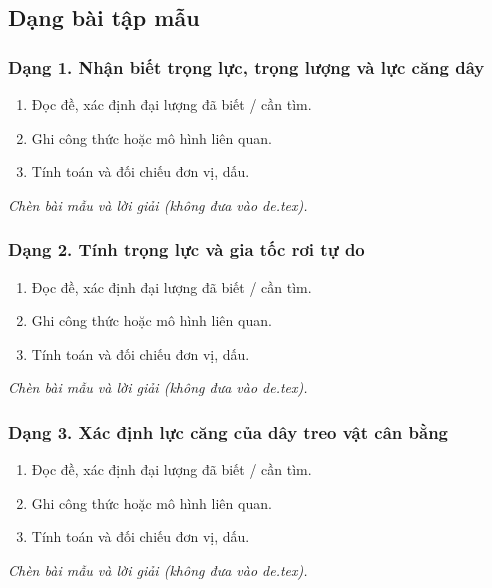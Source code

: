 

\subsection{Dạng bài tập mẫu}
\subsubsection{Dạng 1. Nhận biết trọng lực, trọng lượng và lực căng dây}
\begin{phuongphap}
\begin{enumerate}
\item Đọc đề, xác định đại lượng đã biết / cần tìm.
\item Ghi công thức hoặc mô hình liên quan.
\item Tính toán và đối chiếu đơn vị, dấu.
\end{enumerate}
\end{phuongphap}
\begin{vidumau}
\textit{Chèn bài mẫu và lời giải (không đưa vào de.tex).}
\end{vidumau}

\subsubsection{Dạng 2. Tính trọng lực và gia tốc rơi tự do}
\begin{phuongphap}
\begin{enumerate}
\item Đọc đề, xác định đại lượng đã biết / cần tìm.
\item Ghi công thức hoặc mô hình liên quan.
\item Tính toán và đối chiếu đơn vị, dấu.
\end{enumerate}
\end{phuongphap}
\begin{vidumau}
\textit{Chèn bài mẫu và lời giải (không đưa vào de.tex).}
\end{vidumau}

\subsubsection{Dạng 3. Xác định lực căng của dây treo vật cân bằng}
\begin{phuongphap}
\begin{enumerate}
\item Đọc đề, xác định đại lượng đã biết / cần tìm.
\item Ghi công thức hoặc mô hình liên quan.
\item Tính toán và đối chiếu đơn vị, dấu.
\end{enumerate}
\end{phuongphap}
\begin{vidumau}
\textit{Chèn bài mẫu và lời giải (không đưa vào de.tex).}
\end{vidumau}

